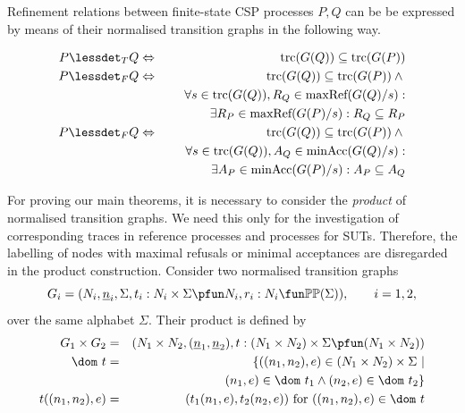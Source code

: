 Refinement relations between finite-state CSP processes $P, Q$ can be be
expressed by means of their normalised transition graphs in the following
way. 
%
\begin{lemma}
  \label{lemma:tgtrcref}
  \begin{eqnarray}
  P \lessdet_T Q & \Leftrightarrow & \trc(G(Q)) \subseteq\trc(G(P))
  \label{eq:trcrefa}
  \\
  \label{eq:failrefa}
  P \lessdet_F Q & \Leftrightarrow & \trc(G(Q)) \subseteq\trc(G(P)) \wedge {} \nonumber
  \\ & & \forall s\in\trc(G(Q)), R_Q\in\maxrefs(G(Q)/s):  \nonumber
  \\ & & \tabd
  \exists R_P\in\maxrefs(G(P)/s): R_Q\subseteq R_P
  \\
  \label{eq:failrefb}
  P \lessdet_F Q & \Leftrightarrow & \trc(G(Q)) \subseteq\trc(G(P)) \wedge {} \nonumber
  \\ & & \forall s\in\trc(G(Q)), A_Q\in\minaccs(G(Q)/s): \nonumber
  \\ & & \tabd
  \exists A_P\in\minaccs(G(P)/s): A_P\subseteq A_Q
  \end{eqnarray}
  \xbox
\end{lemma}
%
For proving our main theorems, it is necessary to consider the \emph{product}
of normalised transition graphs. We need this only for the investigation of
corresponding traces in reference processes and processes for SUTs.
Therefore, the labelling of nodes with maximal refusals or minimal
acceptances are disregarded in the product construction. Consider two
normalised transition graphs
\[
G_i = ( N_i, \ii n_i, \Sigma, t_i : N_i\times\Sigma \pfun N_i, r_i : N_i \fun \mathbb{P}\mathbb{P}(\Sigma)),\qquad i = 1,2,
\]
over the same alphabet $\Sigma$. Their product is defined by
\begin{eqnarray}
G_1\times G_2 & = & (N_1\times N_2,(\ii n_1,\ii n_2), t:(N_1\times N_2)\times\Sigma\pfun (N_1\times N_2))
\\
\dom~t & = & \{ ((n_1,n_2),e)\in (N_1\times N_2)\times\Sigma~|   \nonumber
\\ & & \tabc
(n_1,e)\in\dom~t_1\wedge
(n_2,e) \in\dom~t_2    \}
\\
t((n_1,n_2),e) & = & (t_1(n_1,e),t_2(n_2,e))\ \text{for $((n_1,n_2),e)\in\dom~t$}
\end{eqnarray}




